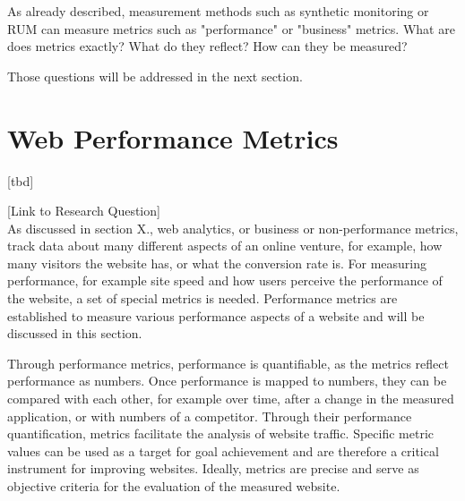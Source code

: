As already described, measurement methods such as synthetic monitoring or RUM can measure metrics such as "performance" or "business" metrics.
What are does metrics exactly?
What do they reflect?
How can they be measured?

Those questions will be addressed in the next section.








\section{Web Performance Metrics}

[tbd]

[Link to Research Question] \\




As discussed in section X., web analytics, or business or non-performance metrics, track data about many different aspects of an online venture, for example, how many visitors the website has, or what the conversion rate is.
For measuring performance, for example site speed and how users perceive the performance of the website, a set of special metrics is needed.
Performance metrics are established to measure various performance aspects of a website and will be discussed in this section.



Through performance metrics, performance is quantifiable, as the metrics reflect performance as numbers.
Once performance is mapped to numbers, they can be compared with each other, for example over time, after a change in the measured application,  or with numbers of a competitor. %
Through their performance quantification, metrics facilitate the analysis of website traffic.
Specific metric values can be used as a target for goal achievement and are therefore a critical instrument for improving websites. %
Ideally, metrics are precise and serve as objective criteria for the evaluation of the measured website. %


